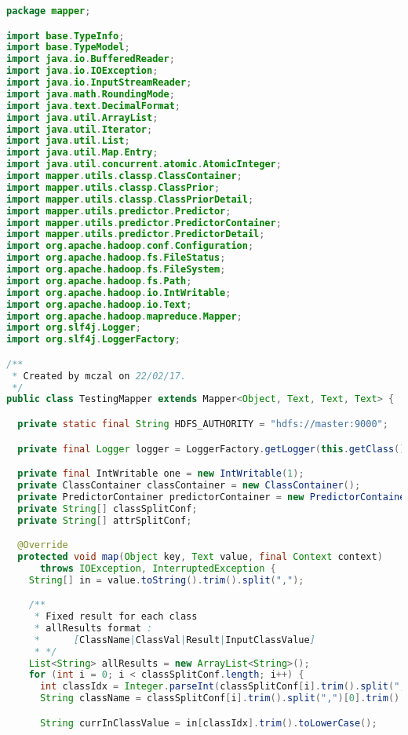 \begin{lstlisting}[language=Java,basicstyle=\tiny,caption=TestingMapper.java]
package mapper;

import base.TypeInfo;
import base.TypeModel;
import java.io.BufferedReader;
import java.io.IOException;
import java.io.InputStreamReader;
import java.math.RoundingMode;
import java.text.DecimalFormat;
import java.util.ArrayList;
import java.util.Iterator;
import java.util.List;
import java.util.Map.Entry;
import java.util.concurrent.atomic.AtomicInteger;
import mapper.utils.classp.ClassContainer;
import mapper.utils.classp.ClassPrior;
import mapper.utils.classp.ClassPriorDetail;
import mapper.utils.predictor.Predictor;
import mapper.utils.predictor.PredictorContainer;
import mapper.utils.predictor.PredictorDetail;
import org.apache.hadoop.conf.Configuration;
import org.apache.hadoop.fs.FileStatus;
import org.apache.hadoop.fs.FileSystem;
import org.apache.hadoop.fs.Path;
import org.apache.hadoop.io.IntWritable;
import org.apache.hadoop.io.Text;
import org.apache.hadoop.mapreduce.Mapper;
import org.slf4j.Logger;
import org.slf4j.LoggerFactory;

/**
 * Created by mczal on 22/02/17.
 */
public class TestingMapper extends Mapper<Object, Text, Text, Text> {

  private static final String HDFS_AUTHORITY = "hdfs://master:9000";

  private final Logger logger = LoggerFactory.getLogger(this.getClass());

  private final IntWritable one = new IntWritable(1);
  private ClassContainer classContainer = new ClassContainer();
  private PredictorContainer predictorContainer = new PredictorContainer();
  private String[] classSplitConf;
  private String[] attrSplitConf;

  @Override
  protected void map(Object key, Text value, final Context context)
      throws IOException, InterruptedException {
    String[] in = value.toString().trim().split(",");

    /**
     * Fixed result for each class
     * allResults format :
     *      [ClassName|ClassVal|Result|InputClassValue]
     * */
    List<String> allResults = new ArrayList<String>();
    for (int i = 0; i < classSplitConf.length; i++) {
      int classIdx = Integer.parseInt(classSplitConf[i].trim().split(",")[1].trim());
      String className = classSplitConf[i].trim().split(",")[0].trim().toLowerCase();

      String currInClassValue = in[classIdx].trim().toLowerCase();


\end{lstlisting}
